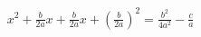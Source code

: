 \documentclass[preview]{standalone}
\begin{document}
\begin{align*}
{x}^{2} + \frac{b}{2 a} x + \frac{b}{2 a} x + {\left( \frac{b}{2 a} \right)}^{2} = \frac{{b}^{2}}{4 {a}^{2}} - \frac{c}{a}
\end{align*}
\end{document}
